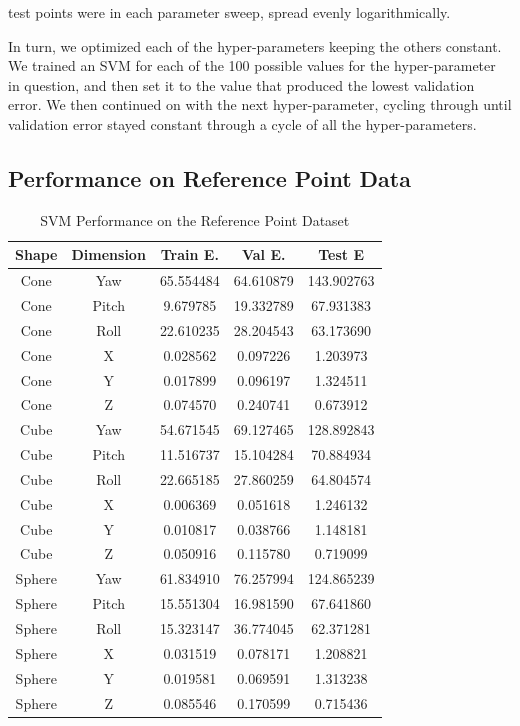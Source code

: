 \documentclass[journal]{IEEEtran}
\begin{document}
 test points were in each parameter sweep, spread evenly logarithmically.

In turn, we optimized each of the hyper-parameters keeping the others constant. We trained an SVM for each of the 100 possible values for the hyper-parameter in question, and then set it to the value that produced the lowest validation error. We then continued on with the next hyper-parameter, cycling through until validation error stayed constant through a cycle of all the hyper-parameters.

\subsection{Performance on Reference Point Data}

\begin{table}[h]
\caption{SVM Performance on the Reference Point Dataset}
\label{SVM_Point}
\centering
	\begin{tabular}{|c|c|c|c|c|}
	\hline
	Shape & Dimension & Train E. & Val E. & Test E\\
   \hline
    Cone &Yaw & 65.554484 & 64.610879 & 143.902763 \\
    Cone &Pitch & 9.679785 & 19.332789 & 67.931383 \\
    Cone &Roll & 22.610235 & 28.204543 & 63.173690 \\
    Cone &X & 0.028562 & 0.097226 & 1.203973 \\
    Cone &Y & 0.017899 & 0.096197 & 1.324511 \\
    Cone &Z & 0.074570 & 0.240741 & 0.673912 \\
    \hline
    Cube & Yaw & 54.671545 & 69.127465 & 128.892843 \\
    Cube & Pitch & 11.516737 & 15.104284 & 70.884934 \\
    Cube & Roll & 22.665185 & 27.860259 & 64.804574 \\
    Cube & X & 0.006369 & 0.051618 & 1.246132 \\
    Cube & Y & 0.010817 & 0.038766 & 1.148181 \\
    Cube & Z & 0.050916 & 0.115780 & 0.719099 \\
    \hline
    Sphere & Yaw & 61.834910 & 76.257994 & 124.865239 \\
    Sphere & Pitch & 15.551304 & 16.981590 & 67.641860 \\
    Sphere & Roll & 15.323147 & 36.774045 & 62.371281 \\
    Sphere & X & 0.031519 & 0.078171 & 1.208821 \\
    Sphere & Y & 0.019581 & 0.069591 & 1.313238 \\
    Sphere & Z & 0.085546 & 0.170599 & 0.715436\\
    \hline
	\end{tabular}
\end{table}
\end{document}
